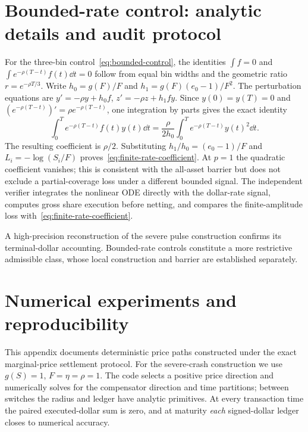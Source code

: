 \documentclass[review,hidelinks,onefignum,onetabnum]{siamonline250211}
\begin{document}
\section{Bounded-rate control: analytic details and audit protocol}\label{app:rate}
For the three-bin control~\eqref{eq:bounded-control}, the identities $\int f=0$ and $\int e^{-\rho(T-t)}f(t)\dd t=0$ follow from equal bin widths and the geometric ratio $r=e^{-\rho T/3}$. Write $h_0=g(F)/F$ and $h_1=g(F)(e_0-1)/F^2$. The perturbation equations are $y'=-\rho y+h_0 f$, $z'=-\rho z+h_1fy$. Since $y(0)=y(T)=0$ and $(e^{-\rho(T-t)})'=\rho e^{-\rho(T-t)}$, one integration by parts gives the exact identity
\begin{equation}\label{eq:ibp}
\int_0^T e^{-\rho(T-t)}f(t)y(t)\dd t
=\frac{\rho}{2h_0}\int_0^T e^{-\rho(T-t)}y(t)^2\dd t.
\end{equation}
The resulting coefficient is $\rho/2$. Substituting $h_1/h_0=(e_0-1)/F$ and $L_i=-\log(S_i/F)$ proves~\eqref{eq:finite-rate-coefficient}. At $p=1$ the quadratic coefficient vanishes; this is consistent with the all-asset barrier but does not exclude a partial-coverage loss under a different bounded signal. The independent verifier integrates the nonlinear ODE directly with the dollar-rate signal, computes gross share execution before netting, and compares the finite-amplitude loss with~\eqref{eq:finite-rate-coefficient}.

A high-precision reconstruction of the severe pulse construction confirms its terminal-dollar accounting. Bounded-rate controls constitute a more restrictive admissible class, whose local construction and barrier are established separately.

\section{Numerical experiments and reproducibility}\label{app:numerics}
This appendix documents deterministic price paths constructed under the exact marginal-price settlement protocol. For the severe-crash construction we use $g(S)=1$, $F=\eta=\rho=1$. The code selects a positive price direction and numerically solves for the compensator direction and time partitions; between switches the radius and ledger have analytic primitives. At every transaction time the paired executed-dollar sum is zero, and at maturity \emph{each} signed-dollar ledger closes to numerical accuracy.
\end{document}
